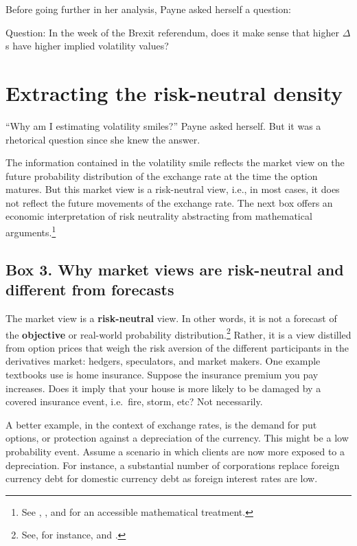 \documentclass[]{book}
\let\rmarkdownfootnote\footnote%
\def\footnote{\protect\rmarkdownfootnote}
\theoremstyle{definition}
\theoremstyle{definition}
\theoremstyle{definition}
\theoremstyle{remark}
\begin{document}
Before going further in her analysis, Payne asked herself a question:

Question: In the week of the Brexit referendum, does it make sense that
higher \(\Delta\)s have higher implied volatility values?

\chapter{Extracting the risk-neutral
density}\label{extracting-the-risk-neutral-density}

``Why am I estimating volatility smiles?'' Payne asked herself. But it
was a rhetorical question since she knew the answer.

The information contained in the volatility smile reflects the market
view on the future probability distribution of the exchange rate at the
time the option matures. But this market view is a risk-neutral view,
i.e., in most cases, it does not reflect the future movements of the
exchange rate. The next box offers an economic interpretation of risk
neutrality abstracting from mathematical arguments.\footnote{See
  \citet{Hull2017}, \citet{Cox-Ross-Rubinstein1979}, and
  \citet{Wilmott2006} for an accessible mathematical treatment.}

\section*{Box 3. Why market views are risk-neutral and different from
forecasts}\label{box-3.-why-market-views-are-risk-neutral-and-different-from-forecasts}

The market view is a \textbf{risk-neutral} view. In other words, it is
not a forecast of the \textbf{objective} or real-world probability
distribution.\footnote{See, for instance,
  \citet{Constantinides-Jackwerth-Perrakis2007} and
  \citet{Garcia-Ghysels-Renault2009}.} Rather, it is a view distilled
from option prices that weigh the risk aversion of the different
participants in the derivatives market: hedgers, speculators, and market
makers. One example textbooks use is home insurance. Suppose the
insurance premium you pay increases. Does it imply that your house is
more likely to be damaged by a covered insurance event, i.e.~fire,
storm, etc? Not necessarily.

A better example, in the context of exchange rates, is the demand for
put options, or protection against a depreciation of the currency. This
might be a low probability event. Assume a scenario in which clients are
now more exposed to a depreciation. For instance, a substantial number
of corporations replace foreign currency debt for domestic currency debt
as foreign interest rates are low.
\end{document}
